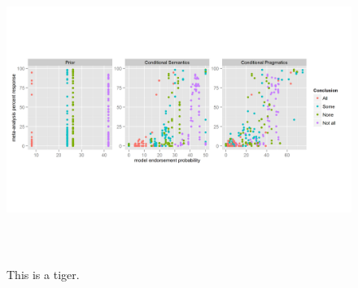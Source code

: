 \documentclass[10pt,letterpaper]{article}
\begin{document}
%

\begin{figure}[t!] %
\centering
  \includegraphics[width=\textwidth,height=10cm]{multiScatter_n6_0,25_alpha1}
  \caption{This is a tiger.}
\end{figure}


%
%
%
\end{document}
